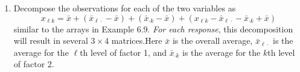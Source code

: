 \begin{enumerate}[label= (\alph*)]
    \item Decompose the observations for each of the two variables as
    \[
        x_{\ell k}
        =
        \bar{x}
        +
        (
            \bar{x}_{\ell \cdot}
            -
            \bar{x}
        )
        +
        (
            \bar{x}_{\cdot k}
            -
            \bar{x}
        )
        +
        (
            x_{\ell k}
            -
            \bar{x}_{\ell \cdot}
            -
            \bar{x}_{\cdot k}
            +
            \bar{x}
        )
    \]
    similar to the arrays in Example 6.9. \textit{For each response}, this decomposition will result
in several $3 \times 4$ matrices.Here $\bar{x}$ is the overall average, $\bar{x}_{\ell \cdot}$ is the average for the $\ell$th
level of factor 1, and $\bar{x}_{\cdot k}$ is the average for the $k$th level of factor 2.


\end{enumerate}
